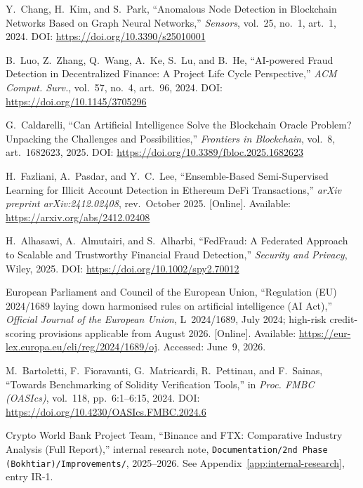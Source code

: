 \documentclass[12pt,a4paper]{report}
\begin{document}
{\begin{enumerate}[label={[\arabic*]}]
\item Y.~Chang, H.~Kim, and S.~Park, ``Anomalous Node Detection in Blockchain Networks Based on Graph Neural Networks,'' \textit{Sensors}, vol.~25, no.~1, art.~1, 2024. DOI: \url{https://doi.org/10.3390/s25010001}

\item B.~Luo, Z.~Zhang, Q.~Wang, A.~Ke, S.~Lu, and B.~He, ``AI-powered Fraud Detection in Decentralized Finance: A Project Life Cycle Perspective,'' \textit{ACM Comput. Surv.}, vol.~57, no.~4, art.~96, 2024. DOI: \url{https://doi.org/10.1145/3705296}
\item G.~Caldarelli, ``Can Artificial Intelligence Solve the Blockchain Oracle Problem? Unpacking the Challenges and Possibilities,'' \textit{Frontiers in Blockchain}, vol.~8, art.~1682623, 2025. DOI: \url{https://doi.org/10.3389/fbloc.2025.1682623}
\item H.~Fazliani, A.~Pasdar, and Y.~C.~Lee, ``Ensemble-Based Semi-Supervised Learning for Illicit Account Detection in Ethereum DeFi Transactions,'' \textit{arXiv preprint arXiv:2412.02408}, rev.~October 2025. [Online]. Available: \url{https://arxiv.org/abs/2412.02408}

\item H.~Alhasawi, A.~Almutairi, and S.~Alharbi, ``FedFraud: A Federated Approach to Scalable and Trustworthy Financial Fraud Detection,'' \textit{Security and Privacy}, Wiley, 2025. DOI: \url{https://doi.org/10.1002/spy2.70012}

\item European Parliament and Council of the European Union, ``Regulation (EU) 2024/1689 laying down harmonised rules on artificial intelligence (AI Act),'' \textit{Official Journal of the European Union}, L~2024/1689, July 2024; high-risk credit-scoring provisions applicable from August 2026. [Online]. Available: \url{https://eur-lex.europa.eu/eli/reg/2024/1689/oj}. Accessed: June~9, 2026.

\item M.~Bartoletti, F.~Fioravanti, G.~Matricardi, R.~Pettinau, and F.~Sainas, ``Towards Benchmarking of Solidity Verification Tools,'' in \textit{Proc. FMBC (OASIcs)}, vol.~118, pp.~6:1--6:15, 2024. DOI: \url{https://doi.org/10.4230/OASIcs.FMBC.2024.6}
\item Crypto World Bank Project Team, ``Binance and FTX: Comparative Industry Analysis (Full Report),'' internal research note, \texttt{Documentation/2nd Phase (Bokhtiar)/Improvements/}, 2025--2026. See Appendix~\ref{app:internal-research}, entry IR-1.


\end{enumerate}}
\end{document}
